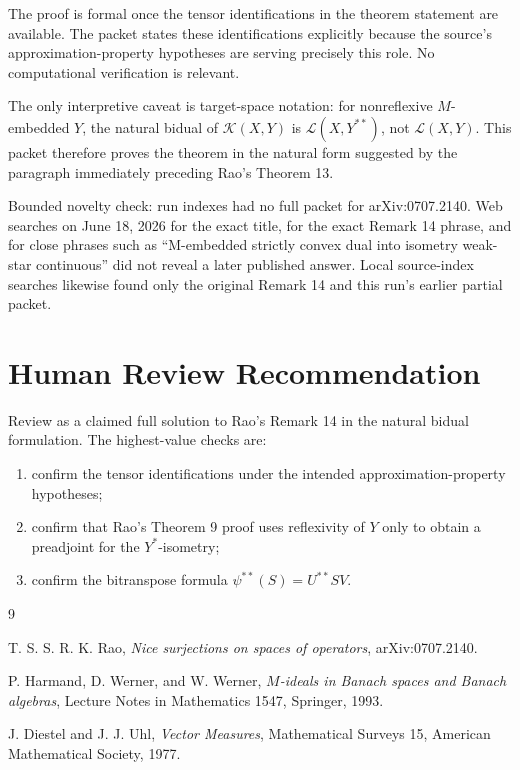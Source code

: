 \documentclass[11pt]{article}
\newcommand{\K}{\mathcal K}
\newcommand{\Lcal}{\mathcal L}
\begin{document}
The proof is formal once the tensor identifications in the theorem statement are available. The packet states these identifications explicitly because the source's approximation-property hypotheses are serving precisely this role. No computational verification is relevant.

The only interpretive caveat is target-space notation: for nonreflexive \(M\)-embedded \(Y\), the natural bidual of \(\K(X,Y)\) is \(\Lcal(X,Y^{**})\), not \(\Lcal(X,Y)\). This packet therefore proves the theorem in the natural form suggested by the paragraph immediately preceding Rao's Theorem 13.

Bounded novelty check: run indexes had no full packet for arXiv:0707.2140. Web searches on June 18, 2026 for the exact title, for the exact Remark 14 phrase, and for close phrases such as ``M-embedded strictly convex dual into isometry weak-star continuous'' did not reveal a later published answer. Local source-index searches likewise found only the original Remark 14 and this run's earlier partial packet.

\section*{Human Review Recommendation}

Review as a claimed full solution to Rao's Remark 14 in the natural bidual formulation. The highest-value checks are:
\begin{enumerate}
\item confirm the tensor identifications under the intended approximation-property hypotheses;
\item confirm that Rao's Theorem 9 proof uses reflexivity of \(Y\) only to obtain a preadjoint for the \(Y^*\)-isometry;
\item confirm the bitranspose formula \( \psi^{**}(S)=U^{**}SV \).
\end{enumerate}

\begin{thebibliography}{9}

T. S. S. R. K. Rao,
\emph{Nice surjections on spaces of operators},
arXiv:0707.2140.

P. Harmand, D. Werner, and W. Werner,
\emph{\(M\)-ideals in Banach spaces and Banach algebras},
Lecture Notes in Mathematics 1547, Springer, 1993.

J. Diestel and J. J. Uhl,
\emph{Vector Measures},
Mathematical Surveys 15, American Mathematical Society, 1977.

\end{thebibliography}
\end{document}
